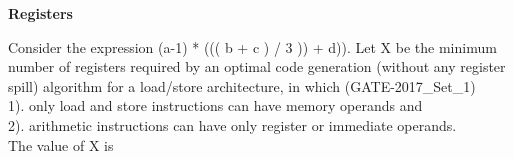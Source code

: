 
\centerline{\textbf{ \LARGE Registers }}

\begin{questyle}
  \question  Consider the expression (a-1) * ((( b + c ) / 3 )) + d)). Let X be the minimum number of
             registers required by an optimal code generation (without any register spill) algorithm
             for a load/store architecture, in which  (GATE-2017\_Set\_1)
             \\ 1). only load and store instructions can have memory operands and
             \\ 2). arithmetic instructions can have only register or immediate operands.
             \\ The value of X is \fillin[2]
\end{questyle}
